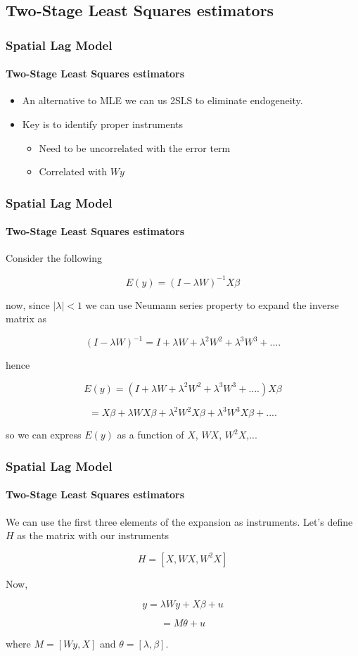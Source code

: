 \documentclass[
  shownotes,
  xcolor={svgnames},
  hyperref={colorlinks,citecolor=DarkBlue,linkcolor=DarkRed,urlcolor=DarkBlue}
  , aspectratio=169]{beamer}
\begin{document}
\subsection{Two-Stage Least Squares estimators}
\begin{frame}[fragile]
\frametitle{Spatial Lag Model}
\framesubtitle{Two-Stage Least Squares estimators}

\begin{itemize}
\item An alternative to MLE we can us 2SLS to eliminate endogeneity.
\bigskip
\item Key is to identify proper instruments
\bigskip
\begin{itemize}
\item Need to be uncorrelated with the error term
\bigskip
\item Correlated with $Wy$
\end{itemize}
\end{itemize}

\end{frame}
\begin{frame}[fragile]
\frametitle{Spatial Lag Model}
\framesubtitle{Two-Stage Least Squares estimators}
Consider the following

\[
E(y)=(I-\lambda W)^{-1}X\beta
\]

now, since $|\lambda|<1$ we can use Neumann series property to expand
the inverse matrix as 

\[
(I-\lambda W)^{-1}=I+\lambda W+\lambda^{2}W^{2}+\lambda^{3}W^{3}+....
\]

hence

\[
E(y)=(I+\lambda W+\lambda^{2}W^{2}+\lambda^{3}W^{3}+....)X\beta
\]

\[
=X\beta+\lambda WX\beta+\lambda^{2}W^{2}X\beta+\lambda^{3}W^{3}X\beta+....
\]

so we can express $E(y)$ as a function of $X$, $WX$, $W^{2}X$,... 


\end{frame}
\begin{frame}[fragile]
\frametitle{Spatial Lag Model}
\framesubtitle{Two-Stage Least Squares estimators}

We can use the first three elements of the expansion as instruments.
Let's define $H$ as the matrix with our instruments 

\[
H=[X,WX,W^{2}X]
\]

Now, 

\[
y=\lambda Wy+X\beta+u
\]

\[
=M\theta+u
\]

\medskip
where $M=[Wy,X]$ and $\theta=[\lambda,\beta]$. 

\end{frame}
\end{document}
